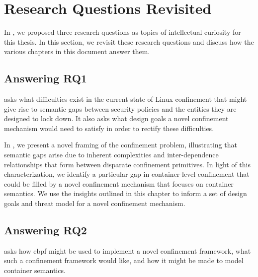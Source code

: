 \section{Research Questions Revisited}%
\label{s:disc-rqs}

In , we proposed three research questions as topics of intellectual
curiosity for this thesis. In this section, we revisit these research questions and
discuss how the various chapters in this document answer them.

\subsection{Answering RQ1}%
\label{ss:disc-rq1}

 asks what difficulties exist in the current state of Linux confinement that
might give rise to semantic gaps between security policies and the entities they are
designed to lock down. It also asks what design goals a novel confinement mechanism would
need to satisfy in order to rectify these difficulties.

In , we present a novel framing of the
confinement problem, illustrating that semantic gaps arise due to inherent complexities
and inter-dependence relationships that form between disparate confinement primitives.  In
light of this characterization, we identify a particular gap in container-level
confinement that could be filled by a novel confinement mechanism that focuses on
container semantics. We use the insights outlined in this chapter to inform a set of
design goals and threat model for a novel confinement mechanism.

\subsection{Answering RQ2}%
\label{ss:disc-rq2}

 asks how \gls{ebpf} might be used to implement a novel confinement framework,
what such a confinement framework would like, and how it might be made to model container
semantics.

